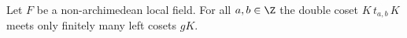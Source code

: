 Let $F$ be a non-archimedean local field. For all $a,b\in\Z$ the double coset $K\,t_{a,b}\,K$ meets only finitely many left cosets $gK$.
